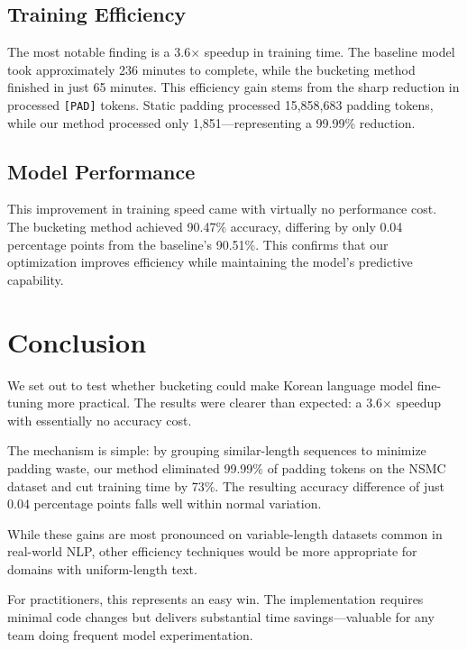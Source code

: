 \documentclass{article}
\begin{document}
\subsection{Training Efficiency}
The most notable finding is a 3.6$\times$ speedup in training time. The baseline model took approximately 236 minutes to complete, while the bucketing method finished in just 65 minutes. This efficiency gain stems from the sharp reduction in processed \texttt{[PAD]} tokens. Static padding processed 15,858,683 padding tokens, while our method processed only 1,851—representing a 99.99\% reduction.

\subsection{Model Performance}
This improvement in training speed came with virtually no performance cost. The bucketing method achieved 90.47\% accuracy, differing by only 0.04 percentage points from the baseline's 90.51\%. This confirms that our optimization improves efficiency while maintaining the model's predictive capability.

\section{Conclusion}

We set out to test whether bucketing could make Korean language model fine-tuning more practical. The results were clearer than expected: a 3.6$\times$ speedup with essentially no accuracy cost.

The mechanism is simple: by grouping similar-length sequences to minimize padding waste, our method eliminated 99.99\% of padding tokens on the NSMC dataset and cut training time by 73\%. The resulting accuracy difference of just 0.04 percentage points falls well within normal variation.

While these gains are most pronounced on variable-length datasets common in real-world NLP, other efficiency techniques would be more appropriate for domains with uniform-length text.

For practitioners, this represents an easy win. The implementation requires minimal code changes but delivers substantial time savings—valuable for any team doing frequent model experimentation.
\end{document}
